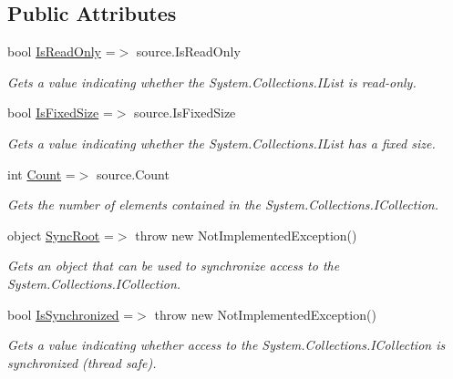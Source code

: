 \subsection*{Public Attributes}
\begin{DoxyCompactItemize}
\item 
bool \mbox{\hyperlink{class_wpf_handler_1_1_u_i_1_1_controls_1_1_collection_control_a2e1f163821f2cbc367ef40d3dcf652eb}{Is\+Read\+Only}} =$>$ source.\+Is\+Read\+Only
\begin{DoxyCompactList}\small\item\em Gets a value indicating whether the System.\+Collections.\+I\+List is read-\/only. \end{DoxyCompactList}\item 
bool \mbox{\hyperlink{class_wpf_handler_1_1_u_i_1_1_controls_1_1_collection_control_aa95fcae30ed2356bfff8154bcceecc8a}{Is\+Fixed\+Size}} =$>$ source.\+Is\+Fixed\+Size
\begin{DoxyCompactList}\small\item\em Gets a value indicating whether the System.\+Collections.\+I\+List has a fixed size. \end{DoxyCompactList}\item 
int \mbox{\hyperlink{class_wpf_handler_1_1_u_i_1_1_controls_1_1_collection_control_af4796b6959bcb870bde22f6d32379242}{Count}} =$>$ source.\+Count
\begin{DoxyCompactList}\small\item\em Gets the number of elements contained in the System.\+Collections.\+I\+Collection. \end{DoxyCompactList}\item 
object \mbox{\hyperlink{class_wpf_handler_1_1_u_i_1_1_controls_1_1_collection_control_a4ab9c597654cf0ca762f2fa13e807fc7}{Sync\+Root}} =$>$ throw new Not\+Implemented\+Exception()
\begin{DoxyCompactList}\small\item\em Gets an object that can be used to synchronize access to the System.\+Collections.\+I\+Collection. \end{DoxyCompactList}\item 
bool \mbox{\hyperlink{class_wpf_handler_1_1_u_i_1_1_controls_1_1_collection_control_a0a40907daa815eb6c01be8677eb09450}{Is\+Synchronized}} =$>$ throw new Not\+Implemented\+Exception()
\begin{DoxyCompactList}\small\item\em Gets a value indicating whether access to the System.\+Collections.\+I\+Collection is synchronized (thread safe). \end{DoxyCompactList}\end{DoxyCompactItemize}
